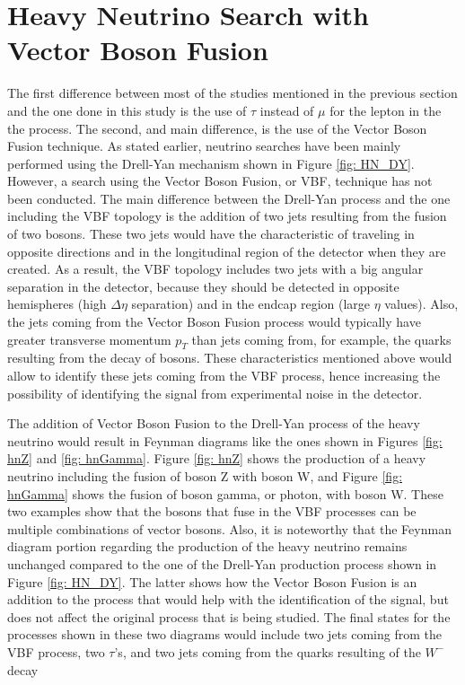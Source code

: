 \section{Heavy Neutrino Search with Vector Boson Fusion}

The first difference between most of the studies mentioned in the previous section and the one done in this study is the use of $\tau$ instead of $\mu$ for the lepton in the the process. The second, and main difference, is the use of the Vector Boson Fusion technique. As stated earlier, neutrino searches have been mainly performed using the Drell-Yan mechanism shown in Figure \ref{fig: HN_DY}. However, a search using the Vector Boson Fusion, or VBF, technique has not been conducted. The main difference between the Drell-Yan process and the one including the VBF topology is the addition of two jets resulting from the fusion of two bosons. These two jets would have the characteristic of traveling in opposite directions and in the longitudinal region of the detector when they are created. As a result, the VBF topology includes two jets with a big angular separation in the detector, because they should be detected in opposite hemispheres (high $\Delta \eta$ separation) and in the endcap region (large $\eta$ values). Also, the jets coming from the Vector Boson Fusion process would typically have greater transverse momentum $p_{T}$ than jets coming from, for example, the quarks resulting from the decay of bosons. These characteristics mentioned above would allow to identify these jets coming from the VBF process, hence increasing the possibility of identifying the signal from experimental noise in the detector.

The addition of Vector Boson Fusion to the Drell-Yan process of the heavy neutrino would result in Feynman diagrams like the ones shown in Figures \ref{fig: hnZ} and \ref{fig: hnGamma}. Figure \ref{fig: hnZ} shows the production of a heavy neutrino including the fusion of boson Z with boson W, and Figure \ref{fig: hnGamma} shows the fusion of boson gamma, or photon, with boson W. These two examples show that the bosons that fuse in the VBF processes can be multiple combinations of vector bosons. Also, it is noteworthy that the Feynman diagram portion regarding the production of the heavy neutrino remains unchanged compared to the one of the Drell-Yan production process shown in Figure \ref{fig: HN_DY}. The latter shows how the Vector Boson Fusion is an addition to the process that would help with the identification of the signal, but does not affect the original process that is being studied. The final states for the processes shown in these two diagrams would include two jets coming from the VBF process, two $\tau$'s, and two jets coming from the quarks resulting of the $W^{-}$ decay

